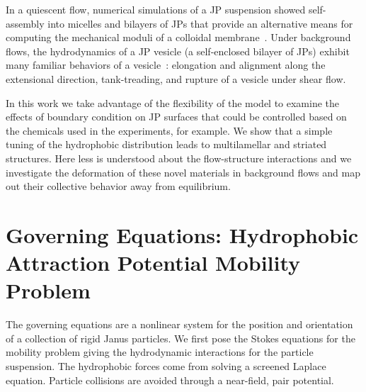 \documentclass[prb,preprint,showpacs,preprintnumbers,amsmath,amssymb,longbibliography]{revtex4-1}
\begin{document}
In a quiescent flow, numerical simulations of a JP suspension showed
self-assembly into micelles and bilayers of JPs that provide an
alternative means for computing the mechanical moduli of a colloidal
membrane~\cite{NaTr00,Fu20,KrFiGuKaHa13}. Under background flows, the
hydrodynamics of a JP vesicle (a self-enclosed bilayer of JPs) exhibit
many familiar behaviors of a vesicle~\cite{Fu2022_JFM}: elongation and
alignment along the extensional direction, tank-treading, and rupture of
a vesicle under shear flow.

In this work we take advantage of the flexibility of the model to
examine the effects of boundary condition on JP surfaces that could be
controlled based on the chemicals used in the experiments, for example.
We show that a simple tuning of the hydrophobic distribution leads to
multilamellar and striated structures. Here less is understood about the
flow-structure interactions and we investigate the deformation of these
novel materials in background flows and map out their collective
behavior away from equilibrium.

\section{Governing Equations: Hydrophobic Attraction Potential Mobility Problem} 
The governing equations are a nonlinear system for the position and
orientation of a collection of rigid Janus particles. We first pose the
Stokes equations for the mobility problem giving the hydrodynamic
interactions for the particle suspension. The hydrophobic forces come
from solving a screened Laplace equation. Particle collisions are
avoided through a near-field, pair potential.

\end{document}
